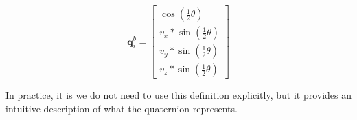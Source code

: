 \begin{equation}
\label{eq:quaternion}
    \mathbf{q}^{b}_{i} = \begin{bmatrix}
            \cos{(\frac{1}{2}\theta)}\\
            v_x * \sin{(\frac{1}{2}\theta)}\\
            v_y * \sin{(\frac{1}{2}\theta)}\\
            v_z * \sin{(\frac{1}{2}\theta)}
        \end{bmatrix}
\end{equation}

In practice, it is we do not need to use this definition explicitly, but it provides an intuitive description of what the quaternion represents.